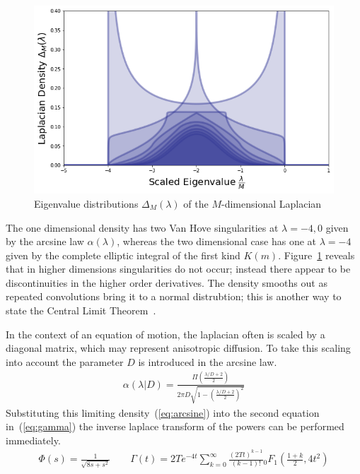 \documentclass{article}[12pt]
\numberwithin{equation}{section}
\begin{document}
\begin{figure}[H]
\centering{}
\captionsetup{justification=centering}
\includegraphics[scale=0.4]{figures/density}
\caption{Eigenvalue distributions $\Delta_M(\lambda)$ of the $M$-dimensional Laplacian}
\label{fig:dos}
\end{figure}
The one dimensional density has two Van Hove singularities at $\lambda=-4,0$
given by the arcsine law $\alpha(\lambda)$, whereas the two dimensional
case has one at $\lambda=-4$ given by the complete elliptic integral
of the first kind $K(m)$. Figure~\ref{fig:dos} reveals that in higher
dimensions singularities do not occur; instead there appear to be
discontinuities in the higher order derivatives. The density smooths out
as repeated convolutions bring it to a normal distrubtion; this is another
way to state the Central Limit Theorem~\cite{}.

In the context of an equation of motion, the laplacian often is scaled by
a diagonal matrix, which may represent anisotropic diffusion. To take this
scaling into account the parameter $D$ is introduced in the arcsine law.
\begin{align}
  \alpha(\lambda|D)=
    \frac{\Pi\left(\frac{\lambda/D+2}{2}\right)}{2\pi D\sqrt{1-\left(\frac{\lambda/D+2}{2}\right)^2}}
  \label{eq:arcsine}
\end{align}
Substituting this limiting density~(\ref{eq:arcsine}) into the second equation
in~(\ref{eq:gamma}) the inverse laplace transform of the powers can be
performed immediately.
\begin{align}
  \Phi(s)=\frac{1}{\sqrt{8s + s^2}}
  \qquad
  \Gamma(t)=2Te^{-4t}
  \sum_{k=0}^{\infty}\frac{(2Tt)^{k-1}}{(k-1)!}
  {}_0F_1(\frac{1+k}{2},4t^2)
\end{align}
\pagebreak
\end{document}
